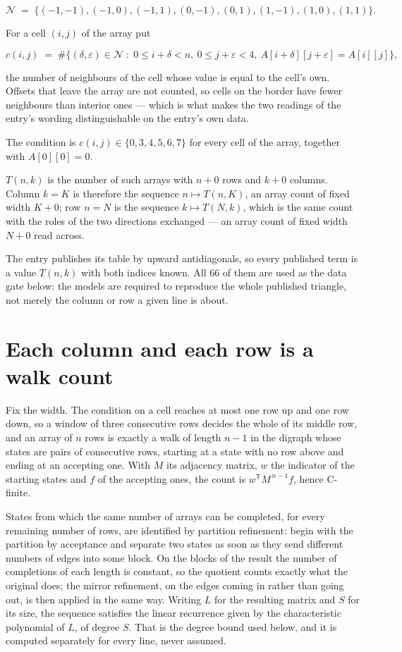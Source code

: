 \documentclass[11pt]{article}
\theoremstyle{definition}
\begin{document}
\[\mathcal{N} \;=\; \{(-1,-1), (-1,0), (-1,1), (0,-1), (0,1), (1,-1), (1,0), (1,1)\}.\]

For a cell $(i,j)$ of the array put

\[c(i,j) \;=\; \#\bigl\{(\delta,\varepsilon)\in\mathcal{N} \;:\; 0\le i+\delta<n,\ 0\le j+\varepsilon<4,\ A[i+\delta][j+\varepsilon] = A[i][j]\bigr\},\]

the number of neighbours of the cell whose value is equal to the cell's own. Offsets that leave the array are not counted, so cells on the border have fewer neighbours than interior ones --- which is what makes the two readings of the entry's wording distinguishable on the entry's own data.

The condition is $c(i,j) \in \{0, 3, 4, 5, 6, 7\}$ for every cell of the array, together with $A[0][0]=0$.

$T(n,k)$ is the number of such arrays with $n + 0$ rows and $k + 0$ columns. Column $k = K$ is therefore the sequence $n \mapsto T(n,K)$, an array count of fixed width $K + 0$; row $n = N$ is the sequence $k \mapsto T(N,k)$, which is the same count with the roles of the two directions exchanged --- an array count of fixed width $N + 0$ read across.

The entry publishes its table by upward antidiagonals, so every published term is a value $T(n,k)$ with both indices known. All 66 of them are used as the data gate below: the models are required to reproduce the whole published triangle, not merely the column or row a given line is about.

\section{Each column and each row is a walk count}

Fix the width. The condition on a cell reaches at most one row up and one row down, so a window of three consecutive rows decides the whole of its middle row, and an array of $n$ rows is exactly a walk of length $n-1$ in the digraph whose states are pairs of consecutive rows, starting at a state with no row above and ending at an accepting one. With $M$ its adjacency matrix, $w$ the indicator of the starting states and $f$ of the accepting ones, the count is $w^{\mathsf T}M^{\,n-1}f$, hence C-finite.

States from which the same number of arrays can be completed, for every remaining number of rows, are identified by partition refinement: begin with the partition by acceptance and separate two states as soon as they send different numbers of edges into some block. On the blocks of the result the number of completions of each length is constant, so the quotient counts exactly what the original does; the mirror refinement, on the edges coming in rather than going out, is then applied in the same way. Writing $L$ for the resulting matrix and $S$ for its size, the sequence satisfies the linear recurrence given by the characteristic polynomial of $L$, of degree $S$. That is the degree bound used below, and it is computed separately for every line, never assumed.
\end{document}
